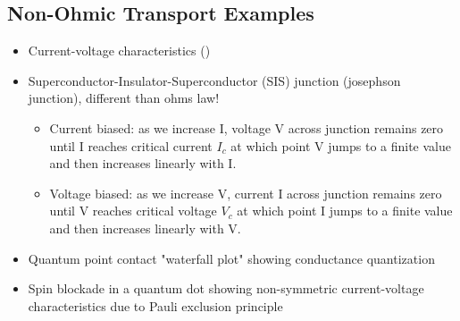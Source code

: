 \subsection{Non-Ohmic Transport Examples}

\begin{itemize}
    \item Current-voltage characteristics ()
    \item Superconductor-Insulator-Superconductor (SIS) junction (josephson junction), different than ohms law!
          \begin{itemize}
              \item Current biased: as we increase I, voltage V across junction remains zero until I reaches critical current $I_c$ at which point V jumps to a finite value and then increases linearly with I.
              \item Voltage biased: as we increase V, current I across junction remains zero until V reaches critical voltage $V_c$ at which point I jumps to a finite value and then increases linearly with V.
          \end{itemize}
    \item Quantum point contact "waterfall plot" showing conductance quantization \parencite{Cronenwett2002}
    \item Spin blockade in a quantum dot showing non-symmetric current-voltage characteristics due to Pauli exclusion principle \parencite{Ono2002}
\end{itemize}


